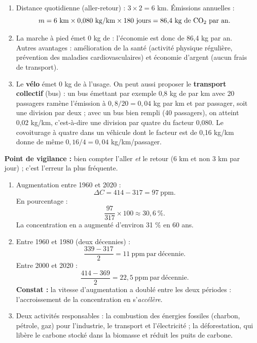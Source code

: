 \documentclass[11pt]{article}
\begin{document}
\begin{corrige}
\begin{enumerate}
\item Distance quotidienne (aller-retour) : $3 \times 2 = 6$ km. Émissions annuelles :
\[ m = 6\ \mathrm{km} \times 0{,}080\ \mathrm{kg/km} \times 180\ \mathrm{jours} = 86{,}4\ \mathrm{kg\ de\ \ce{CO2}\ par\ an.} \]
\item La marche à pied émet $0$ kg de  : l'économie est donc de 86,4 kg par an. Autres avantages : amélioration de la santé (activité physique régulière, prévention des maladies cardiovasculaires) et économie d'argent (aucun frais de transport).
\item Le \textbf{vélo} émet 0 kg de  à l'usage. On peut aussi proposer le \textbf{transport collectif} (bus) : un bus émettant par exemple 0,8 kg de  par km avec 20 passagers ramène l'émission à $0{,}8/20 = 0{,}04$ kg par km et par passager, soit une division par deux ; avec un bus bien rempli (40 passagers), on atteint 0,02 kg/km, c'est-à-dire une division par quatre du facteur 0,080. Le covoiturage à quatre dans un véhicule dont le facteur est de 0,16 kg/km donne de même $0{,}16/4 = 0{,}04$ kg/km/passager.
\end{enumerate}
\textbf{Point de vigilance :} bien compter l'aller \emph{et} le retour (6 km et non 3 km par jour) ; c'est l'erreur la plus fréquente.
\end{corrige}

\begin{corrige}
\begin{enumerate}
\item Augmentation entre 1960 et 2020 :
\[ \Delta C = 414 - 317 = 97\ \mathrm{ppm}. \]
En pourcentage :
\[ \frac{97}{317} \times 100 \approx 30{,}6\ \%. \]
La concentration en  a augmenté d'environ 31 \% en 60 ans.
\item Entre 1960 et 1980 (deux décennies) :
\[ \frac{339 - 317}{2} = 11\ \mathrm{ppm\ par\ décennie.} \]
Entre 2000 et 2020 :
\[ \frac{414 - 369}{2} = 22{,}5\ \mathrm{ppm\ par\ décennie.} \]
\textbf{Constat :} la vitesse d'augmentation a doublé entre les deux périodes : l'accroissement de la concentration en  s'\emph{accélère}.
\item Deux activités responsables : la combustion des énergies fossiles (charbon, pétrole, gaz) pour l'industrie, le transport et l'électricité ; la déforestation, qui libère le carbone stocké dans la biomasse et réduit les puits de carbone.
\end{enumerate}
\end{corrige}
\end{document}
